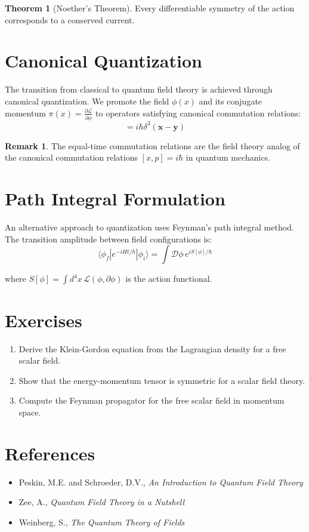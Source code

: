 \documentclass[11pt,a4paper]{article}
\theoremstyle{definition}
\newtheorem{theorem}{Theorem}[section]
\newtheorem*{remark}{Remark}
\begin{document}
\begin{theorem}[Noether's Theorem]
Every differentiable symmetry of the action corresponds to a conserved current.
\end{theorem}

\section{Canonical Quantization}

The transition from classical to quantum field theory is achieved through canonical quantization. We promote the field $\phi(x)$ and its conjugate momentum $\pi(x) = \frac{\partial\mathcal{L}}{\partial\dot{\phi}}$ to operators satisfying canonical commutation relations:
\begin{equation}
    [\hat{\phi}(\mathbf{x},t), \hat{\pi}(\mathbf{y},t)] = i\hbar\delta^3(\mathbf{x}-\mathbf{y})
\end{equation}

\begin{remark}
The equal-time commutation relations are the field theory analog of the canonical commutation relations $[x,p] = i\hbar$ in quantum mechanics.
\end{remark}

\section{Path Integral Formulation}

An alternative approach to quantization uses Feynman's path integral method. The transition amplitude between field configurations is:
\begin{equation}
    \langle\phi_f|e^{-iHt/\hbar}|\phi_i\rangle = \int \mathcal{D}\phi \, e^{iS[\phi]/\hbar}
\end{equation}

where $S[\phi] = \int d^4x \, \mathcal{L}(\phi,\partial\phi)$ is the action functional.

\section{Exercises}

\begin{enumerate}
    \item Derive the Klein-Gordon equation from the Lagrangian density for a free scalar field.
    \item Show that the energy-momentum tensor is symmetric for a scalar field theory.
    \item Compute the Feynman propagator for the free scalar field in momentum space.
\end{enumerate}

\section{References}

\begin{itemize}
    \item Peskin, M.E. and Schroeder, D.V., \textit{An Introduction to Quantum Field Theory}
    \item Zee, A., \textit{Quantum Field Theory in a Nutshell}
    \item Weinberg, S., \textit{The Quantum Theory of Fields}
\end{itemize}
\end{document}
